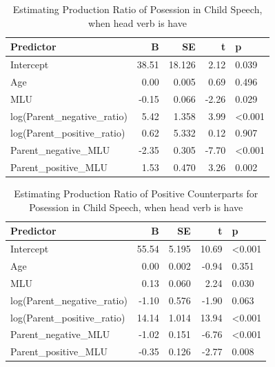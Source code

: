 \documentclass[
  english,
  man,floatsintext]{apa6}
\begin{document}
\begin{table}

\caption{\label{tab:unnamed-chunk-10}Estimating Production Ratio of Posession in Child Speech, when head verb is have}
\centering
\begin{tabular}[t]{l|r|r|r|l}
\hline
Predictor & B & SE & t & p\\
\hline
Intercept & 38.51 & 18.126 & 2.12 & 0.039\\
\hline
Age & 0.00 & 0.005 & 0.69 & 0.496\\
\hline
MLU & -0.15 & 0.066 & -2.26 & 0.029\\
\hline
log(Parent\_negative\_ratio) & 5.42 & 1.358 & 3.99 & <0.001\\
\hline
log(Parent\_positive\_ratio) & 0.62 & 5.332 & 0.12 & 0.907\\
\hline
Parent\_negative\_MLU & -2.35 & 0.305 & -7.70 & <0.001\\
\hline
Parent\_positive\_MLU & 1.53 & 0.470 & 3.26 & 0.002\\
\hline
\end{tabular}
\end{table}

\begin{table}

\caption{\label{tab:unnamed-chunk-10}Estimating Production Ratio of Positive Counterparts for Posession in Child Speech, when head verb is have}
\centering
\begin{tabular}[t]{l|r|r|r|l}
\hline
Predictor & B & SE & t & p\\
\hline
Intercept & 55.54 & 5.195 & 10.69 & <0.001\\
\hline
Age & 0.00 & 0.002 & -0.94 & 0.351\\
\hline
MLU & 0.13 & 0.060 & 2.24 & 0.030\\
\hline
log(Parent\_negative\_ratio) & -1.10 & 0.576 & -1.90 & 0.063\\
\hline
log(Parent\_positive\_ratio) & 14.14 & 1.014 & 13.94 & <0.001\\
\hline
Parent\_negative\_MLU & -1.02 & 0.151 & -6.76 & <0.001\\
\hline
Parent\_positive\_MLU & -0.35 & 0.126 & -2.77 & 0.008\\
\hline
\end{tabular}
\end{table}

\clearpage
\end{document}
